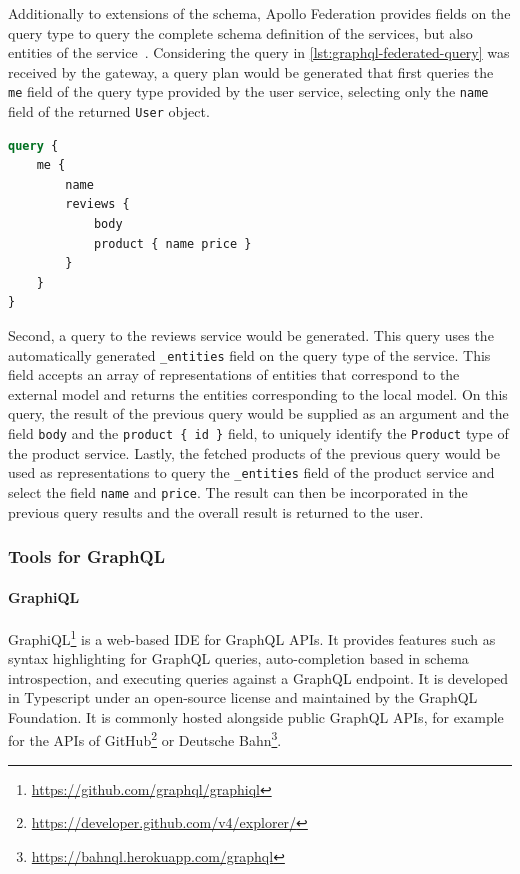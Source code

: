 Additionally to extensions of the schema, Apollo Federation provides fields on the query type to query the complete schema definition of the services, but also entities of the service~\cite{MDGa}.
Considering the query in \autoref{lst:graphql-federated-query} was received by the gateway, a query plan would be generated that first queries the \texttt{me} field of the query type provided by the user service, selecting only the \texttt{name} field of the returned \texttt{User} object.

\begin{lstlisting}[caption={Query to a Federated GraphQL \ac{API}~\cite{MDG}}, language=graphql, label={lst:graphql-federated-query}]
query {
    me {
        name
        reviews {
            body
            product { name price }
        }
    }
}
\end{lstlisting}

Second, a query to the reviews service would be generated.
This query uses the automatically generated \texttt{\_entities} field on the query type of the service.
This field accepts an array of representations of entities that correspond to the external model and returns the entities corresponding to the local model.
On this query, the result of the previous query would be supplied as an argument and the field \texttt{body} and the \texttt{product \{ id \}} field, to uniquely identify the \texttt{Product} type of the product service.
Lastly, the fetched products of the previous query would be used as representations to query the \texttt{\_entities} field of the product service and select the field \texttt{name} and \texttt{price}.
The result can then be incorporated in the previous query results and the overall result is returned to the user.

\subsubsection{Tools for GraphQL}\label{sec:graphql-tools}


\paragraph{GraphiQL}

GraphiQL\footnote{\url{https://github.com/graphql/graphiql}} is a web-based \ac{IDE} for GraphQL \acp{API}.
It provides features such as syntax highlighting for GraphQL queries, auto-completion based in schema introspection, and executing queries against a GraphQL endpoint.
It is developed in Typescript under an open-source license and maintained by the GraphQL Foundation.
It is commonly hosted alongside public GraphQL \acp{API}, for example for the \acp{API} of GitHub\footnote{\url{https://developer.github.com/v4/explorer/}} or Deutsche Bahn\footnote{\url{https://bahnql.herokuapp.com/graphql}}.


